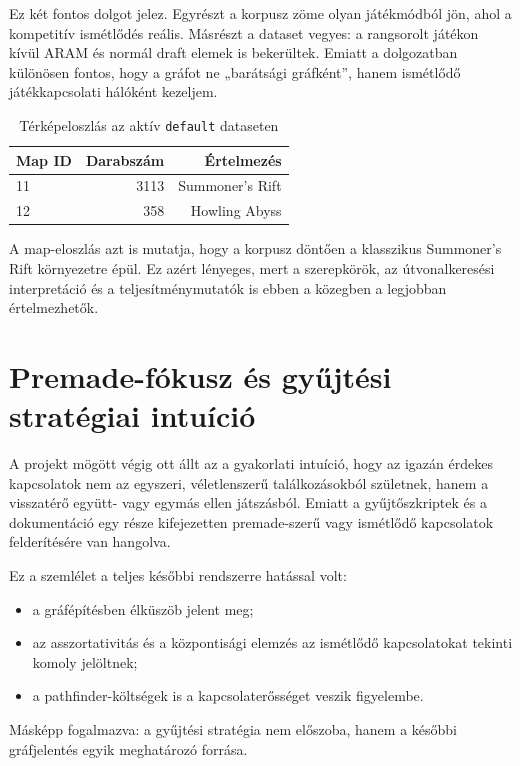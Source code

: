 ﻿\documentclass[a4paper,12pt]{report}
\begin{document}
Ez két fontos dolgot jelez. Egyrészt a korpusz zöme olyan játékmódból jön, ahol a kompetitív ismétlődés reális. Másrészt a dataset vegyes: a rangsorolt játékon kívül ARAM és normál draft elemek is bekerültek. Emiatt a dolgozatban különösen fontos, hogy a gráfot ne „barátsági gráfként”, hanem ismétlődő játékkapcsolati hálóként kezeljem.

\begin{table}[H]
\centering
\caption{Térképeloszlás az aktív \texttt{default} dataseten}
\begin{tabular}{lrr}
\toprule
\textbf{Map ID} & \textbf{Darabszám} & \textbf{Értelmezés} \\
\midrule
11 & 3113 & Summoner's Rift \\
12 & 358 & Howling Abyss \\
\bottomrule
\end{tabular}
\end{table}

A map-eloszlás azt is mutatja, hogy a korpusz döntően a klasszikus Summoner's Rift környezetre épül. Ez azért lényeges, mert a szerepkörök, az útvonalkeresési interpretáció és a teljesítménymutatók is ebben a közegben a legjobban értelmezhetők.

\section{Premade-fókusz és gyűjtési stratégiai intuíció}

A projekt mögött végig ott állt az a gyakorlati intuíció, hogy az igazán érdekes kapcsolatok nem az egyszeri, véletlenszerű találkozásokból születnek, hanem a visszatérő együtt- vagy egymás ellen játszásból. Emiatt a gyűjtőszkriptek és a dokumentáció egy része kifejezetten premade-szerű vagy ismétlődő kapcsolatok felderítésére van hangolva.

Ez a szemlélet a teljes későbbi rendszerre hatással volt:

\begin{itemize}
    \item a gráfépítésben élküszöb jelent meg;
    \item az asszortativitás és a központisági elemzés az ismétlődő kapcsolatokat tekinti komoly jelöltnek;
    \item a pathfinder-költségek is a kapcsolaterősséget veszik figyelembe.
\end{itemize}

Másképp fogalmazva: a gyűjtési stratégia nem előszoba, hanem a későbbi gráfjelentés egyik meghatározó forrása.
\end{document}
